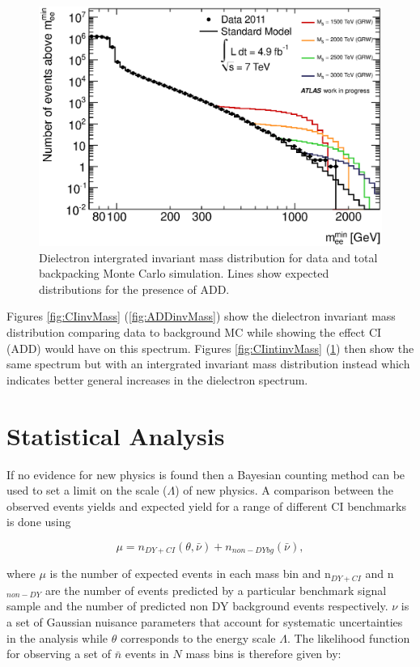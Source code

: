 	\begin{figure}[h!p]
	\centering
	\includegraphics[width=0.7\linewidth]{images/ADD_int_inv_mass.eps}
	\caption{Dielectron intergrated invariant mass distribution for data and total backpacking Monte Carlo simulation. Lines show expected distributions for the presence of ADD.}
	\label{fig:ADDintinvMass}
	\end{figure}


	Figures \ref{fig:CIinvMass} (\ref{fig:ADDinvMass}) show the dielectron invariant mass distribution comparing data to background MC while showing the effect CI (ADD) would have on this spectrum. Figures \ref{fig:CIintinvMass} (\ref{fig:ADDintinvMass}) then show the same spectrum but with an intergrated invariant mass distribution instead which indicates better general increases in the dielectron spectrum.





\section{Statistical Analysis}

	If no evidence for new physics is found then a Bayesian counting method can be used to set a limit on the scale ($\Lambda$) of new physics. A comparison between the observed events yields and expected yield for a range of different CI benchmarks is done using 

	\begin{equation}
	        \mu = n_{DY+CI}(\theta,\bar{\nu}) + n_{non-DY bg}(\bar{\nu}),
	\end{equation}

	where $\mu$ is the number of expected events in each mass bin and n$_{DY+CI}$ and n$_{non-DY}$ are the number of events predicted by a particular benchmark signal sample and the number of predicted non DY background events respectively. $\nu$ is a set of Gaussian nuisance parameters that account for systematic uncertainties in the analysis while $\theta$ corresponds to the energy scale $\Lambda$.
	The likelihood function for observing a set of $\bar{n}$ events in $N$ mass bins is therefore given by: 

